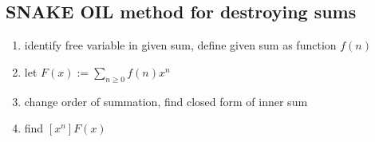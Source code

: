 \subsection{\uppercase{Snake oil} method for destroying sums}
\begin{enumerate}
  \item identify free variable in given sum, define given sum as function $f(n)$
  \item let $F(x) := \sum_{n \geq 0} f(n) x^n$
  \item change order of summation, find closed form of inner sum
  \item find $[x^n]F(x)$
\end{enumerate}
